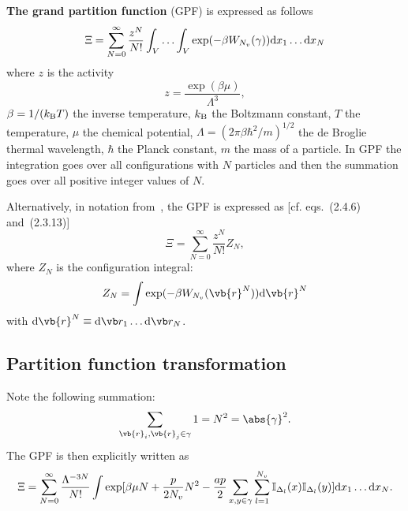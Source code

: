 \textbf{The grand partition function} (GPF) is expressed as follows~\cite[eqs.~(2.4.6) and~(2.3.13)]{HansenMcDonald13}
\begin{equation*}
	\Xi = \sum_{N=0}^{\infty}\frac{z^N}{N!} \int_{V} \dotsc \int_{V} \exp(-\beta W_{N_v}(\gamma)) {\rm d} x_1 \dotsc {\rm d} x_N
\end{equation*}
where $z$ is the activity
\begin{equation*}
	z = \frac{\exp(\beta \mu)}{\Lambda^3},
\end{equation*}
$\beta = 1/(k_{\rm B} T)$ the inverse temperature, $k_{\rm B}$ the Boltzmann constant, $T$ the temperature, $\mu$ the chemical potential, $\Lambda = (2\pi\beta\hbar^2/m)^{1/2}$ the de Broglie thermal wavelength, $\hbar$ the Planck constant, $m$ the mass of a particle. In GPF the integration goes over all configurations with $N$ particles and then the summation goes over all positive integer values of $N$.

\begin{mdframed}[linecolor=black,linewidth=1pt,leftline=true]
	Alternatively, in notation from~\cite{HansenMcDonald13}, the GPF is expressed as [cf. eqs.~(2.4.6) and~(2.3.13)]
	\begin{equation}\label{ZGR}
		\Xi=\sum_{N=0}^{\infty}\frac{z^N}{N!}Z_N,
	\end{equation}
	where $Z_N$ is the configuration integral:
	\begin{equation}
		Z_N = \int\exp(-\beta W_{N_v}(\vb{r}^N)){\rm d}\vb{r}^N
	\end{equation}
	with ${\rm d} \vb{r}^N \equiv {\rm d}{\vb r_1} \dotsc {\rm d}{\vb r_N}$.
\end{mdframed}


	\subsection{Partition function transformation}
Note the following summation:
\begin{equation}
	\sum_{\vb{r}_i,\vb{r}_j \in \gamma} 1 = N^2 = \abs{\gamma}^2.
\end{equation}
The GPF is then explicitly written as
\begin{equation}
	\label{eq:gpf1}
	\Xi = \sum_{N=0}^{\infty} \frac{\Lambda^{-3N}}{N!}\int \exp[\beta\mu N + \frac{p}{2N_{v}} N^2 - \frac{ap}{2} \sum_{x,y \in \gamma} \sum_{l=1}^{N_v} \mathbb{I}_{\Delta_l}(x)\mathbb{I}_{\Delta_l}(y)] {\rm d} x_1 \dotsc {\rm d} x_N.
\end{equation}

